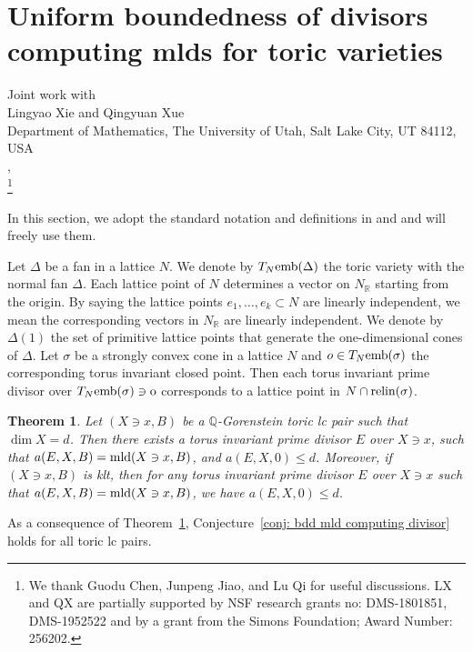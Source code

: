 \documentclass[11pt]{amsart}
\numberwithin{equation}{section}
\newcommand{\Qq}{\mathbb{Q}}
\newcommand{\Rr}{\mathbb{R}}
\newcommand{\mld}{{\rm{mld}}}
\newtheorem{thm}{Theorem}[section]
\theoremstyle{definition}
\theoremstyle{definition}
\begin{document}
\section{Uniform boundedness of divisors computing mlds for toric varieties}
\begin{center}
	Joint work with\\
	Lingyao Xie and Qingyuan Xue\\
Department of Mathematics, The University of Utah, Salt Lake City, UT 84112, USA\\  , \\
	\footnote[1]{We thank Guodu Chen, Junpeng Jiao, and Lu Qi for useful discussions. LX and QX are partially supported by NSF research grants no: DMS-1801851, DMS-1952522 and by a grant from the Simons Foundation; Award Number: 256202. }
\end{center}

In this section, we adopt the standard notation and definitions in \cite{Oda88} and \cite{Amb06} and will freely use them. 

Let $\Delta$ be a fan in a lattice $N$. We denote by $T_N \rm{emb}(\Delta)$ the toric variety with the normal fan $\Delta$. Each lattice point of $N$ determines a vector on $N_{\Rr}$ starting from the origin. By saying the lattice points $e_1,\dots,e_k\subset N$ are linearly independent, we mean the corresponding vectors in $N_{\Rr}$ are linearly independent. We denote by $\Delta(1)$ the set of primitive lattice points that generate the one-dimensional cones of $\Delta$. Let $\sigma$ be a strongly convex cone in a lattice $N$ and $o\in T_N\rm{emb}(\sigma)$ the corresponding torus invariant closed point. Then each torus invariant prime divisor over $T_N\rm{emb}(\sigma)\ni o$ corresponds to a lattice point in $N\cap \rm{relin}(\sigma)$.


\begin{thm}\label{thm: toric mld bdd}
Let $(X\ni x, B)$ be a $\Qq$-Gorenstein toric lc pair such that $\dim X=d$. Then there exists a torus invariant prime divisor $E$ over $X\ni x$, such that $a(E,X,B)=\mld(X\ni x, B)$, and $a(E,X,0)\leq d$. Moreover, if $(X\ni x, B)$ is klt, then for any torus invariant prime divisor $E$ over $X\ni x$ such that $a(E,X,B)=\mld(X\ni x, B)$, we have $a(E,X,0)\leq d$.
\end{thm}

As a consequence of Theorem~\ref{thm: toric mld bdd}, Conjecture~\ref{conj: bdd mld computing divisor} holds for all toric lc pairs.
\end{document}
